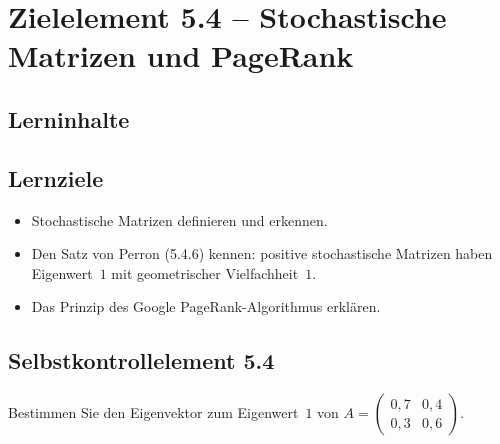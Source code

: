 \documentclass[a4paper,12pt]{article}
\begin{document}
\newpage

\section*{Zielelement 5.4 -- Stochastische Matrizen und PageRank}

\subsection*{Lerninhalte}
\begin{center}
\end{center}

\subsection*{Lernziele}
\begin{itemize}
  \item Stochastische Matrizen definieren und erkennen.
  \item Den Satz von Perron (5.4.6) kennen: positive stochastische Matrizen haben Eigenwert~$1$ mit geometrischer Vielfachheit~$1$.
  \item Das Prinzip des Google PageRank-Algorithmus erklären.
\end{itemize}

\subsection*{Selbstkontrollelement 5.4}
Bestimmen Sie den Eigenvektor zum Eigenwert~$1$ von $A = \begin{pmatrix}0{,}7 & 0{,}4 \\ 0{,}3 & 0{,}6\end{pmatrix}$.
\end{document}
